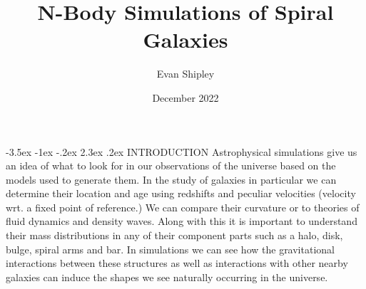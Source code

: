 \documentclass[11pt]{article}
\title{\textbf{N-Body Simulations of Spiral Galaxies}}
\author{Evan Shipley}
\affil{\textit{University of Maryland, Astronomy Department}}
\date{December 2022}
\begin{document}
\makeatletter
\renewcommand\section{\@startsection {section}{1}{\z@}%
                                   {-3.5ex \@plus -1ex \@minus -.2ex}%
                                   {2.3ex \@plus.2ex}%
                                   {\fontfamily{qpl}\Large\bfseries}}%
\renewcommand\subsection{\@startsection{subsection}{2}{\z@}%
                                     {-2.0ex\@plus -0.5ex \@minus -.1ex}%
                                     {1.0ex \@plus .1ex}%
                                 {\fontfamily{qpl}\large\bfseries}}%
\renewcommand\subsubsection{\@startsection{subsubsection}{3}{\z@}%
                                     {-3.25ex\@plus -1ex \@minus -.2ex}%
                                     {1.5ex \@plus .2ex}%
                                     {\normalfont\large\bfseries}}%
\makeatother

\maketitle

\section{INTRODUCTION}
Astrophysical simulations give us an idea of what to look for in our observations of the universe based on the models used to generate them. In the study of galaxies in particular we can determine their location and age using redshifts and peculiar velocities (velocity wrt. a fixed point of reference.) We can compare their curvature or to theories of fluid dynamics and density waves. Along with this it is important to understand their mass distributions in any of their component parts such as a halo, disk, bulge, spiral arms and bar. In simulations we can see how the gravitational interactions between these structures as well as interactions with other nearby galaxies can induce the shapes we see naturally occurring in the universe. 
\end{document}
